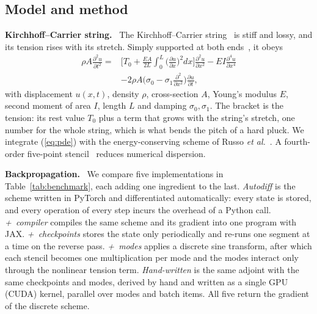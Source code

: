\documentclass[a4paper]{article}
\newcommand{\head}[1]{\par\vspace{1pt}\noindent\textbf{#1.}\ \ignorespaces}
\begin{document}
\begin{sloppy}
\section{Model and method}
\head{Kirchhoff--Carrier string}
The Kirchhoff--Carrier string~\cite[Sec.~8.1]{bilbao2009} is stiff and lossy,
and its tension rises with its stretch. Simply supported at both
ends~\cite{russo2026}, it obeys
\begin{equation}
\begin{aligned}
\rho A\frac{\partial^2u}{\partial t^2}={}&
 \bigg[T_0+\frac{EA}{2L}\!\int_0^L\!\Big(\frac{\partial u}{\partial x}\Big)^{\!2}dx\bigg]
 \frac{\partial^2u}{\partial x^2}
 -EI\frac{\partial^4u}{\partial x^4}\\
 &-2\rho A\Big(\sigma_0-\sigma_1\frac{\partial^2}{\partial x^2}\Big)
 \frac{\partial u}{\partial t},
\end{aligned}
\label{eq:pde}
\end{equation}
with displacement $u(x,t)$, density $\rho$, cross-section $A$, Young's
modulus $E$, second moment of area $I$, length $L$ and damping
$\sigma_0,\sigma_1$. The bracket is the tension: its rest value $T_0$ plus a
term that grows with the string's stretch, one number for the whole string,
which is what bends the pitch of a hard pluck. We integrate
(\ref{eq:pde}) with the energy-conserving scheme of Russo \emph{et
al.}~\cite{russo2026}. A fourth-order five-point
stencil~\cite[Sec.~6.3.1]{bilbao2009} reduces
numerical dispersion.

\head{Backpropagation}
We compare five implementations in Table~\ref{tab:benchmark}, each adding
one ingredient to the last. \emph{Autodiff} is the scheme written in
PyTorch and differentiated automatically: every state is stored, and every operation of every step incurs the overhead of a Python call. \emph{+~compiler} compiles the same scheme and its gradient into
one program with JAX. \emph{+~checkpoints} stores the state only
periodically and re-runs one segment at a time on the reverse pass. \emph{+~modes} applies a discrete sine transform, after which each stencil becomes one
multiplication per mode and the modes interact only through the nonlinear
tension term.
\emph{Hand-written} is the same adjoint with the same checkpoints and
modes, derived by hand and written as a single GPU (CUDA) kernel, parallel
over modes and batch items. All five return the gradient of the discrete
scheme.


\end{sloppy}
\end{document}
